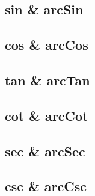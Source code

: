 \documentclass[UTF8]{ctexart}
\begin{document}
\subsection{sin \& arcSin}





\subsection{cos \& arcCos}



\subsection{tan \& arcTan}




\subsection{cot \& arcCot}




\subsection{sec \& arcSec}




\subsection{csc \& arcCsc}
\end{document}
